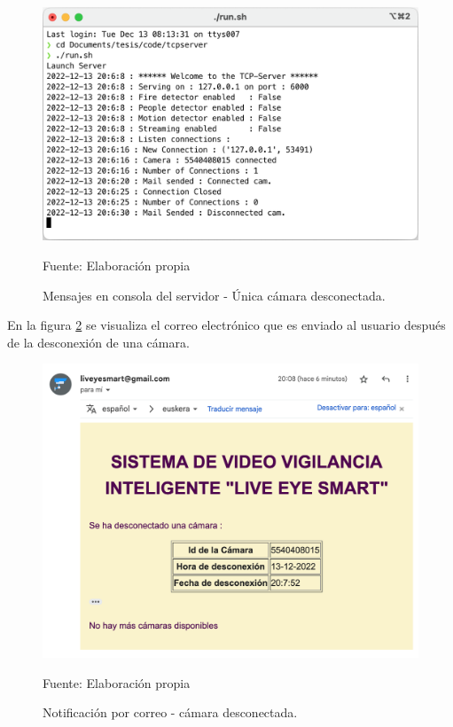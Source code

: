 \begin{figure}[H]
    \begin{center}
        \includegraphics[width=12cm]{img/capitulo_6/cam_disconnected_1_cam.png}
    \end{center}
    \begin{center}
        \caption{Mensajes en consola del servidor - Única cámara desconectada.}
        Fuente: Elaboración propia
        \label{desconected_camera_server}
    \end{center}
\end{figure}

En la figura \ref{desconected_camera_server_mail} se visualiza el correo electrónico que es enviado al usuario después de la desconexión de una cámara.

\begin{figure}[H]
    \begin{center}
        \includegraphics[width=12cm]{img/capitulo_6/mail4.png}
    \end{center}
    \begin{center}
        \caption{Notificación por correo - cámara desconectada.}
        Fuente: Elaboración propia
        \label{desconected_camera_server_mail}
    \end{center}
\end{figure}


